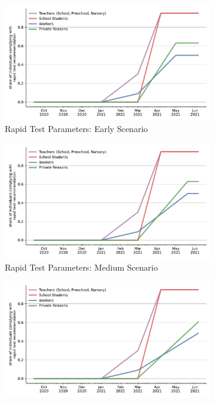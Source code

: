 \begin{figure}[ht] %
  \centering
  \begin{subfigure}[b]{0.3\textwidth}
    \includegraphics[width=\textwidth]{figures/results/figures/data/testing/rapid_test_demand/robustness_check_params_early_shares}
    \caption{Rapid Test Parameters: Early Scenario}
    \label{fig:robustness_early_params}
  \end{subfigure}
  \hfill
  \begin{subfigure}[b]{0.3\textwidth}
    \includegraphics[width=\textwidth]{figures/results/figures/data/testing/rapid_test_demand/robustness_check_params_medium_shares}
    \caption{Rapid Test Parameters: Medium Scenario}
    \label{fig:robustness_medium_params}
  \end{subfigure}
  \hfill
  \begin{subfigure}[b]{0.3\textwidth}
    \includegraphics[width=\textwidth]{figures/results/figures/data/testing/rapid_test_demand/robustness_check_params_late_shares}

\end{subfigure}
\end{figure}
